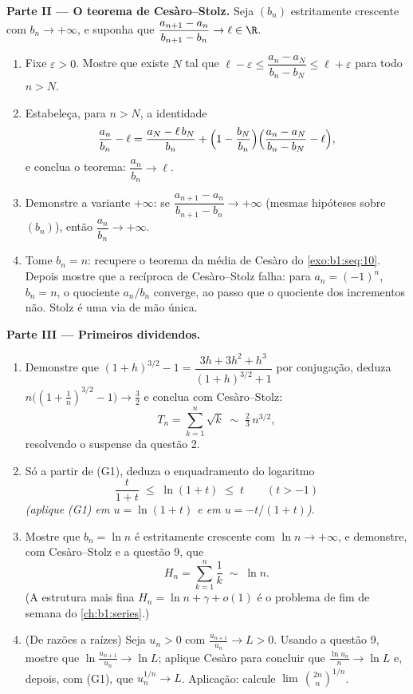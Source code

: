 \begin{problem}[{Problema de fim de semana --- o teorema de Cesàro--Stolz
e a assintótica $u_n \sim \sqrt{3/n}$ para $u_{n+1} = \sin
u_n$}]
\medskip
\noindent\textbf{Parte II --- O teorema de Cesàro--Stolz.} Seja
$(b_n)$ estritamente crescente com $b_n \to +\infty$, e
suponha que $\dfrac{a_{n+1} - a_n}{b_{n+1} - b_n} \to \ell \in \R$.
\begin{enumerate}
  \item Fixe $\varepsilon > 0$. Mostre que existe $N$ tal que
        $\ell - \varepsilon \leq \dfrac{a_n - a_N}{b_n - b_N}
        \leq \ell + \varepsilon$ para todo $n > N$.
  \item Estabeleça, para $n > N$, a identidade
        \[
        \frac{a_n}{b_n} - \ell
        = \frac{a_N - \ell\,b_N}{b_n}
        + \Bigl(1 - \frac{b_N}{b_n}\Bigr)
        \Bigl(\frac{a_n - a_N}{b_n - b_N} - \ell\Bigr),
        \]
        e conclua o teorema: $\dfrac{a_n}{b_n} \to \ell$.
  \item Demonstre a variante $+\infty$: se $\dfrac{a_{n+1} -
        a_n}{b_{n+1} - b_n} \to +\infty$ (mesmas hipóteses sobre
        $(b_n)$), então $\dfrac{a_n}{b_n} \to +\infty$.
  \item Tome $b_n = n$: recupere o teorema da média de Cesàro do
        \cref{exo:b1:seq:10}. Depois mostre que a recíproca de
        Cesàro--Stolz falha: para $a_n = (-1)^n$, $b_n = n$, o
        quociente $a_n/b_n$ converge, ao passo que o quociente dos
        incrementos não. Stolz é uma via de mão única.
\end{enumerate}

\medskip
\noindent\textbf{Parte III --- Primeiros dividendos.}
\begin{enumerate}
  \item Demonstre que $(1+h)^{3/2} - 1 = \dfrac{3h + 3h^2 +
        h^3}{(1+h)^{3/2} + 1}$ por conjugação, deduza
        $n\bigl((1 + \tfrac1n)^{3/2} - 1\bigr) \to \tfrac32$ e conclua com Cesàro--Stolz:
        \[
        T_n = \sum_{k=1}^{n} \sqrt k \;\sim\; \tfrac23\,
        n^{3/2} ,
        \]
        resolvendo o suspense da questão 2.
  \item Só a partir de (G1), deduza o enquadramento do logaritmo
        \[
        \frac{t}{1 + t} \;\leq\; \ln(1 + t) \;\leq\; t
        \qquad (t > -1)
        \]
        \emph{(aplique (G1) em $u = \ln(1+t)$ e em $u =
        -t/(1+t)$)}.
  \item Mostre que $b_n = \ln n$ é estritamente crescente com
        $\ln n \to +\infty$, e demonstre, com Cesàro--Stolz e a
        questão 9, que
        \[
        H_n = \sum_{k=1}^{n} \frac 1k \;\sim\; \ln n .
        \]
        (A estrutura mais fina $H_n = \ln n + \gamma + o(1)$ é o
        problema de fim de semana do \cref{ch:b1:series}.)
  \item (De razões a raízes) Seja $u_n > 0 $ com
        $\frac{u_{n+1}}{u_n} \to L > 0$. Usando a questão 9, mostre que
        $\ln\frac{u_{n+1}}{u_n} \to \ln L$; aplique Cesàro para
        concluir que $\frac{\ln u_n}{n} \to \ln L$ e, depois, com (G1),
        que $u_n^{1/n} \to L$. Aplicação: calcule
        $\lim\,\binom{2n}{n}^{1/n}$.
\end{enumerate}


\end{problem}
